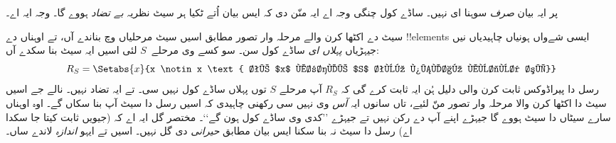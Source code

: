\documentclass[../../../include/open-logic-section]{subfiles}
\begin{document}
پر ایہ بیان \emph{صرف} سوہنا ای نہیں۔ ساڈے کول چنگی وجہ اے ایہ منّن
دی کہ ایس بیان اُتے ٹکیا ہر سیٹ نظریہ \emph{بے تضاد} ہووے گا۔ وجہ ایہ اے۔

سیٹ دے اکٹھا کرن والے مرحلہ وار تصور مطابق اسیں سیٹ مرحلیاں وچ بناندے آں،
تے اوہناں دے !!{element}s ایسی شےواں ہونیاں چاہیدیاں نیں جیہڑیاں
\emph{پہلاں ای} ساڈے کول سن۔ سو کسے وی مرحلے~$S$ لئی اسیں ایہ سیٹ بنا سکدے آں:
\[
	R_S = \Setabs{x}{x \notin x \text{ تے $x$ مرحلے $S$ توں پہلاں موجود سی}}
\]
رسل دا پیراڈوکس ثابت کرن والی دلیل ہُن ایہ ثابت کرے گی کہ $R_S$ آپ مرحلے
$S$ توں پہلاں ساڈے کول نہیں سی۔ تے ایہ تضاد نہیں۔ نالے جے اسیں سیٹ دا
اکٹھا کرن والا مرحلہ وار تصور منّ لئیے، تاں سانوں ایہ \emph{آس} وی نہیں
سی رکھنی چاہیدی کہ اسیں رسل دا سیٹ آپ بنا سکاں گے۔ اوہ اوہناں سارے
سیٹاں دا سیٹ ہووے گا جیہڑے اپنے آپ دے رکن نہیں تے جیہڑے ’’کدی وی ساڈے
کول ہون گے‘‘۔ مختصر گل ایہ اے کہ (جیویں ثابت کیتا جا سکدا اے) رسل دا سیٹ
نہ بنا سکنا ایس بیان مطابق \emph{حیرانی} دی گل نہیں۔ اسیں تے ایہو \emph{اندازہ}
لاندے ساں۔

%

\end{document}
